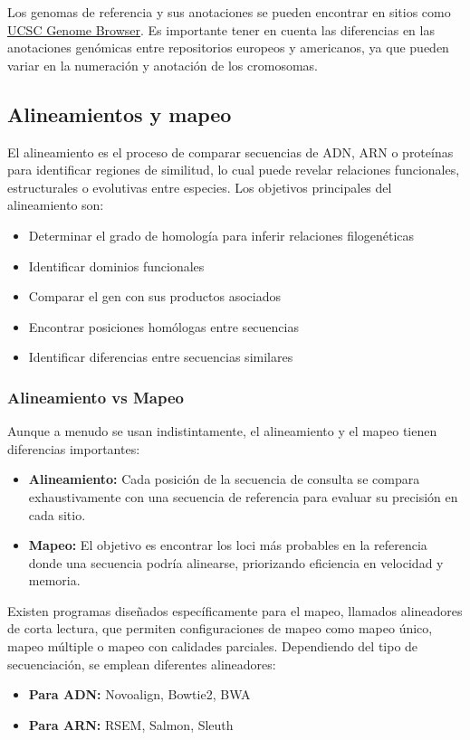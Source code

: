 Los genomas de referencia y sus anotaciones se pueden encontrar en sitios como \href{https://hgdownload.soe.ucsc.edu/downloads.html}{UCSC Genome Browser}. Es importante tener en cuenta las diferencias en las anotaciones genómicas entre repositorios europeos y americanos, ya que pueden variar en la numeración y anotación de los cromosomas.

\subsection{Alineamientos y mapeo}
El alineamiento es el proceso de comparar secuencias de ADN, ARN o proteínas para identificar regiones de similitud, lo cual puede revelar relaciones funcionales, estructurales o evolutivas entre especies. Los objetivos principales del alineamiento son:
\begin{itemize}
\item Determinar el grado de homología para inferir relaciones filogenéticas
\item Identificar dominios funcionales
\item Comparar el gen con sus productos asociados
\item Encontrar posiciones homólogas entre secuencias
\item Identificar diferencias entre secuencias similares
\end{itemize}

\subsubsection{Alineamiento vs Mapeo}
Aunque a menudo se usan indistintamente, el alineamiento y el mapeo tienen diferencias importantes:
\begin{itemize}
\item \textbf{Alineamiento:} Cada posición de la secuencia de consulta se compara exhaustivamente con una secuencia de referencia para evaluar su precisión en cada sitio.
\item \textbf{Mapeo:} El objetivo es encontrar los loci más probables en la referencia donde una secuencia podría alinearse, priorizando eficiencia en velocidad y memoria.
\end{itemize}

Existen programas diseñados específicamente para el mapeo, llamados alineadores de corta lectura, que permiten configuraciones de mapeo como mapeo único, mapeo múltiple o mapeo con calidades parciales. Dependiendo del tipo de secuenciación, se emplean diferentes alineadores:
\begin{itemize}
\item \textbf{Para ADN:} Novoalign, Bowtie2, BWA
\item \textbf{Para ARN:} RSEM, Salmon, Sleuth
\end{itemize}

